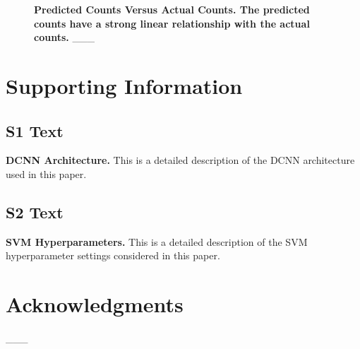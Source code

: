 \documentclass[10pt,letterpaper]{article}
\begin{document}
            \begin{figure}[h]
                
                \caption{{\bf Predicted Counts Versus Actual Counts. The predicted counts have a strong linear relationship with the actual counts.} \_\_\_}
                \label{svm_confidence_proportion}
            \end{figure}

\section*{Supporting Information}

\subsection*{S1 Text}
\label{S1_Text}
{\bf DCNN Architecture.}  This is a detailed description of the DCNN architecture used in this paper.

\subsection*{S2 Text}
\label{S2_Text}
{\bf SVM Hyperparameters.}  This is a detailed description of the SVM hyperparameter settings considered in this paper.

\section*{Acknowledgments}
\_\_\_

\nolinenumbers


\end{document}

